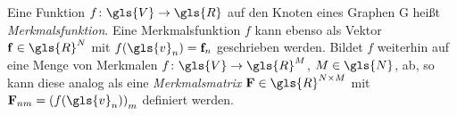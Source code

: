 Eine Funktion $f \colon \gls{V} \to \gls{R}$ auf den Knoten eines Graphen \gls{G} heißt \emph{Merkmalsfunktion}.
Eine Merkmalsfunktion $f$ kann ebenso als Vektor $\ve{f} \in \gls{R}^N$ mit $f\left(\gls{v}_n\right) = \ve{f}_n$ geschrieben werden.
Bildet $f$ weiterhin auf eine Menge von Merkmalen $f \colon \gls{V} \to \gls{R}^M$, $M \in \gls{N}$, ab, so kann diese analog als eine \emph{Merkmalsmatrix} $\ma{F} \in \gls{R}^{N \times M}$ mit $\ma{F}_{nm} = {\left(f\left(\gls{v}_n\right)\right)}_m$ definiert werden.
